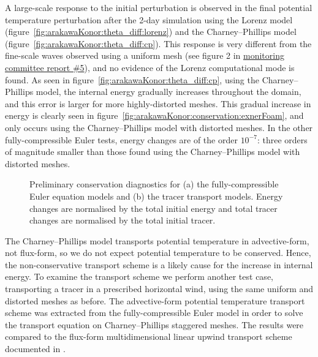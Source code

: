 \documentclass[a4paper,11pt]{article}
\begin{document}
A large-scale response to the initial perturbation is observed in the final potential temperature perturbation after the 2-day simulation using the Lorenz model (figure~\ref{fig:arakawaKonor:theta_diff:lorenz}) and the Charney--Phillips model (figure~\ref{fig:arakawaKonor:theta_diff:cp}).
This response is very different from the fine-scale waves observed using a uniform mesh (see figure 2 in \href{http://www.datumedge.co.uk/publications/mc-report-2017-06.pdf}{monitoring committee report \#5}), and no evidence of the Lorenz computational mode is found.
As seen in figure~\ref{fig:arakawaKonor:theta_diff:cp}, using the Charney--Phillips model, the internal energy gradually increases throughout the domain, and this error is larger for more highly-distorted meshes.
This gradual increase in energy is clearly seen in figure~\ref{fig:arakawaKonor:conservation:exnerFoam}, and only occurs using the Charney--Phillips model with distorted meshes.
In the other fully-compressible Euler tests, energy changes are of the order $10^{-7}$: three orders of magnitude smaller than those found using the Charney--Phillips model with distorted meshes.

\begin{figure}
	\centering
	\begin{subfigure}{\textwidth}
		\label{fig:arakawaKonor:conservation:exnerFoam}
		\label{fig:arakawaKonor:conservation:advection}
		
	\end{subfigure}
	\caption{Preliminary conservation diagnostics for (a) the fully-compressible Euler equation models and (b) the tracer transport models.  Energy changes are normalised by the total initial energy and total tracer changes are normalised by the total initial tracer.}
	\label{fig:arakawaKonor:conservation}
\end{figure}

The Charney--Phillips model transports potential temperature in advective-form, not flux-form, so we do not expect potential temperature to be conserved.  Hence, the non-conservative transport scheme is a likely cause for the increase in internal energy.
To examine the transport scheme we perform another test case, transporting a tracer in a prescribed horizontal wind, using the same uniform and distorted meshes as before.  
The advective-form potential temperature transport scheme was extracted from the fully-compressible Euler model in order to solve the transport equation on Charney--Phillips staggered meshes.  The results were compared to the flux-form multidimensional linear upwind transport scheme documented in \citet{shaw2017}.
\end{document}
